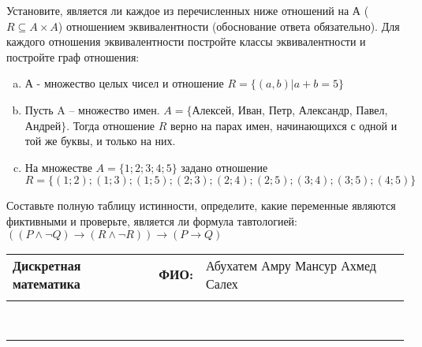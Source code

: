\documentclass[10pt]{exam}
\newcommand{\class}{Дискретная математика}
\newcommand{\examdate}{}
\begin{document}
\begin{questions}
\question
Установите, является ли каждое из перечисленных ниже отношений на А ($R \subseteq A \times A$) отношением эквивалентности (обоснование ответа обязательно). Для каждого отношения эквивалентности постройте классы 
эквивалентности и постройте граф отношения:
\begin{enumerate} [a)]\setcounter{enumi}{0}
\item А - множество целых чисел и отношение $R = \{(a,b)|a + b = 5\}$
\item Пусть A – множество имен. $A = \{ $Алексей, Иван, Петр, Александр, Павел, Андрей$ \}$. Тогда отношение $R $ верно на парах имен, начинающихся с одной и той же буквы, и только на них.
\item На множестве $A = \{1; 2; 3; 4; 5\}$ задано отношение $R = \{(1; 2); (1; 3); (1; 5); (2; 3); (2; 4); (2; 5); (3; 4); (3; 5); (4; 5)\}$
\end{enumerate}\question Составьте полную таблицу истинности, определите, какие переменные являются фиктивными и проверьте, является ли формула тавтологией:
$(( P \land \neg Q) \rightarrow (R \land \neg R)) \rightarrow (P \rightarrow Q)$

\end{questions}
\newpage
\begin{flushright}
\begin{tabular}{p{2.8in} r l}
\textbf{\class} & \textbf{ФИО:} &Абухатем Амру Мансур Ахмед Салех
\\

\textbf{\examdate} &&\\
\end{tabular}\\
\end{flushright}
\rule[1ex]{\textwidth}{.1pt}
\end{document}
